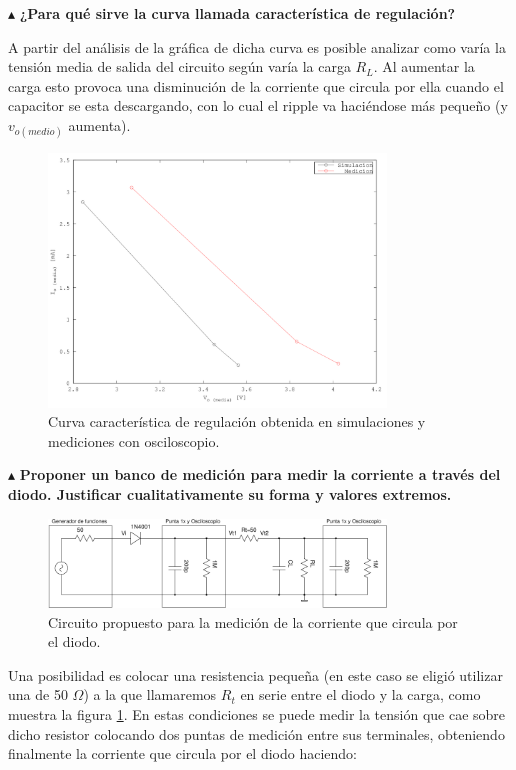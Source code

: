 \noindent$\blacktriangle$\textbf{ ¿Para qué sirve la curva llamada característica de regulación?}

A partir del análisis de la gráfica de dicha curva es posible analizar como varía la tensión media de salida del circuito según varía la carga $R_{L}$. Al aumentar la carga esto provoca una disminución de la corriente que circula por ella cuando el capacitor se esta descargando, con lo cual el ripple va haciéndose más pequeño (y $v_{o (medio)}$ aumenta).

\begin{figure}[H]
  \centering
      \includegraphics[width=0.8\textwidth]{gfxsantiago/FIG_Rectificador_Simple_Caracterisica_Regulacion.png}
  \caption{Curva característica de regulación obtenida en simulaciones y mediciones con osciloscopio.}
\end{figure}

\noindent$\blacktriangle$\textbf{ Proponer un banco de medición para medir la corriente a través del diodo. Justificar cualitativamente su forma y valores extremos.}

\begin{figure}[H]
  \centering
      \includegraphics[width=0.8\textwidth]{gfxsantiago/FIG_CIRC_Rectificador_Simple_Corriente_Diodo.pdf}
  \caption{Circuito propuesto para la medición de la corriente que circula por el diodo.}
  \label{circ:corr_diodo}
\end{figure}

Una posibilidad es colocar una resistencia pequeña (en este caso se eligió utilizar una de 50 $\Omega$) a la que llamaremos $R_t$ en serie entre el diodo y la carga, como muestra la figura \ref{circ:corr_diodo}. En estas condiciones se puede medir la tensión que cae sobre dicho resistor colocando dos puntas de medición entre sus terminales, obteniendo finalmente la corriente que circula por el diodo haciendo:

